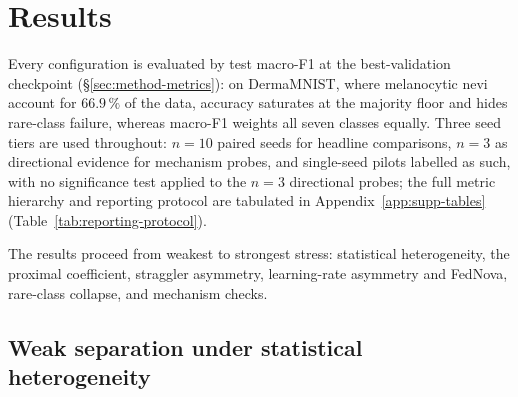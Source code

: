 \documentclass[11pt,a4paper]{report}
\begin{document}

\chapter{Results}
\label{ch:results}




Every configuration is evaluated by test macro-F1 at the best-validation checkpoint
(\S\ref{sec:method-metrics}): on DermaMNIST, where melanocytic nevi account for
$66.9\,\%$ of the data, accuracy saturates at the
majority floor and hides rare-class failure, whereas macro-F1 weights all seven
classes equally. Three seed tiers are used throughout: $n=10$ paired seeds for
headline comparisons, $n=3$ as directional evidence for mechanism probes, and
single-seed pilots labelled as such, with no significance test applied to the
$n=3$ directional probes; the full metric hierarchy and reporting protocol are
tabulated in Appendix~\ref{app:supp-tables} (Table~\ref{tab:reporting-protocol}).

The results proceed from weakest to strongest stress: statistical heterogeneity,
the proximal coefficient, straggler asymmetry, learning-rate asymmetry and FedNova,
rare-class collapse, and mechanism checks.




\section{Weak separation under statistical heterogeneity}
\label{sec:statistical-heterogeneity}
\end{document}
